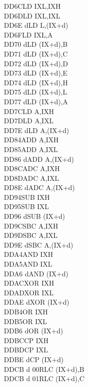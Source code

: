 \begin{multicols}{3}
{\begin{tabbing}
    DD6C\>LD IXL,IXH\UNDOC\\
    DD6D\>LD IXL,IXL\UNDOC\\
    DD6E d\>LD L,(IX+d)\\
    DD6F\>LD IXL,A\UNDOC\\
    DD70 d\>LD (IX+d),B\\
    DD71 d\>LD (IX+d),C\\
    DD72 d\>LD (IX+d),D\\
    DD73 d\>LD (IX+d),E\\
    DD74 d\>LD (IX+d),H\\
    DD75 d\>LD (IX+d),L\\
    DD77 d\>LD (IX+d),A\\
    DD7C\>LD A,IXH\UNDOC\\
    DD7D\>LD A,IXL\UNDOC\\
    DD7E d\>LD A,(IX+d)\\
    DD84\>ADD A,IXH\UNDOC\\
    DD85\>ADD A,IXL\UNDOC\\
    DD86 d\>ADD A,(IX+d)\\
    DD8C\>ADC A,IXH\UNDOC\\
    DD8D\>ADC A,IXL\UNDOC\\
    DD8E d\>ADC A,(IX+d)\\
    DD94\>SUB IXH\UNDOC\\
    DD95\>SUB IXL\UNDOC\\
    DD96 d\>SUB (IX+d)\\
    DD9C\>SBC A,IXH\UNDOC\\
    DD9D\>SBC A,IXL\UNDOC\\
    DD9E d\>SBC A,(IX+d)\\
    DDA4\>AND IXH\UNDOC\\
    DDA5\>AND IXL\UNDOC\\
    DDA6 d\>AND (IX+d)\\
    DDAC\>XOR IXH\UNDOC\\
    DDAD\>XOR IXL\UNDOC\\
    DDAE d\>XOR (IX+d)\\
    DDB4\>OR IXH\UNDOC\\
    DDB5\>OR IXL\UNDOC\\
    DDB6 d\>OR (IX+d)\\
    DDBC\>CP IXH\UNDOC\\
    DDBD\>CP IXL\UNDOC\\
    DDBE d\>CP (IX+d)\\
    DDCB d 00\>RLC (IX+d),B\UNDOC\\
    DDCB d 01\>RLC (IX+d),C\UNDOC\\

\end{tabbing}}
\end{multicols}
